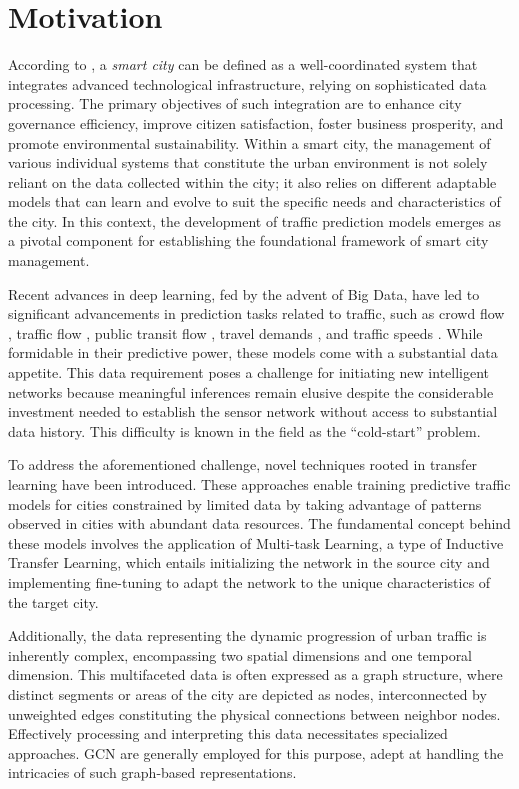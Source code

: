 \section{Motivation}

According to \cite{yin2015literature}, a \textit{smart city} can be defined as a well-coordinated system that integrates advanced technological infrastructure, relying on sophisticated data processing. The primary objectives of such integration are to enhance city governance efficiency, improve citizen satisfaction, foster business prosperity, and promote environmental sustainability. Within a smart city, the management of various individual systems that constitute the urban environment is not solely reliant on the data collected within the city; it also relies on different adaptable models that can learn and evolve to suit the specific needs and characteristics of the city. In this context, the development of traffic prediction models emerges as a pivotal component for establishing the foundational framework of smart city management.

Recent advances in deep learning, fed by the advent of Big Data, have led to significant advancements in prediction tasks related to traffic, such as crowd flow \cite{zhang2018predicting, jin2018spatio}, traffic flow \cite{polson2017deep, wu2018hybrid}, public transit flow \cite{liu2019deeppf, chai2018bike}, travel demands \cite{geng2019spatiotemporal}, and traffic speeds \cite{yu2017spatio}. While formidable in their predictive power, these models come with a substantial data appetite. This data requirement poses a challenge for initiating new intelligent networks because meaningful inferences remain elusive despite the considerable investment needed to establish the sensor network without access to substantial data history. This difficulty is known in the field as the ``cold-start'' problem.

To address the aforementioned challenge, novel techniques rooted in transfer learning  \cite{pan2009survey} have been introduced. These approaches enable training predictive traffic models for cities constrained by limited data by taking advantage of patterns observed in cities with abundant data resources. The fundamental concept behind these models involves the application of Multi-task Learning, a type of Inductive Transfer Learning, which entails initializing the network in the source city and implementing fine-tuning to adapt the network to the unique characteristics of the target city.

Additionally, the data representing the dynamic progression of urban traffic is inherently complex, encompassing two spatial dimensions and one temporal dimension. This multifaceted data is often expressed as a graph structure, where distinct segments or areas of the city are depicted as nodes, interconnected by unweighted edges constituting the physical connections between neighbor nodes. Effectively processing and interpreting this data necessitates specialized approaches. \gls{GCN} are generally employed for this purpose, adept at handling the intricacies of such graph-based representations.


